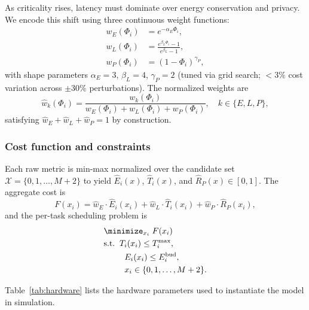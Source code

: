 \documentclass[journal]{IEEEtran}
\newcommand{\set}[1]{\mathcal{#1}}
\begin{document}
As criticality rises, latency must dominate over energy conservation
and privacy. We encode this shift using three continuous weight
functions:
\begin{align}
  w_E(\Phi_i) &= e^{-\alpha_E \Phi_i},
  \label{eq:weight_energy}\\[4pt]
  w_L(\Phi_i) &= \frac{e^{\beta_L \Phi_i} - 1}{e^{\beta_L} - 1},
  \label{eq:weight_latency}\\[4pt]
  w_P(\Phi_i) &= (1 - \Phi_i)^{\gamma_P},
  \label{eq:weight_privacy}
\end{align}
with shape parameters $\alpha_E = 3$, $\beta_L = 4$, $\gamma_P = 2$
(tuned via grid search; $<3\%$ cost variation across $\pm 30\%$
perturbations). The normalized weights are
\begin{equation}
  \hat{w}_k(\Phi_i) = \frac{w_k(\Phi_i)}{w_E(\Phi_i)+w_L(\Phi_i)+w_P(\Phi_i)},
  \quad k \in \{E,L,P\},
  \label{eq:weight_normalised}
\end{equation}
satisfying $\hat{w}_E + \hat{w}_L + \hat{w}_P = 1$ by construction.

\subsubsection{Cost function and constraints}

Each raw metric is min-max normalized over the candidate set
$\set{X}=\{0,1,\ldots,M+2\}$ to yield $\hat{E}_i(x)$, $\hat{T}_i(x)$,
and $\hat{R}_P(x) \in [0,1]$. The aggregate cost is
\begin{equation}
  F(x_i) =
    \hat{w}_E \cdot \hat{E}_i(x_i)
    + \hat{w}_L \cdot \hat{T}_i(x_i)
    + \hat{w}_P \cdot \hat{R}_P(x_i),
  \label{eq:cost_function}
\end{equation}
and the per-task scheduling problem is
\begin{align}
  &\minimize_{x_i}\; F(x_i) \label{eq:opt_obj}\\
  &\text{s.t.}\;\;T_i(x_i) \leq T^{\max}_i, \label{eq:sla_c}\\
  &\;\;\;\;\;\;\;\;\;E_i(x_i) \leq E^{\mathrm{bud}}_i, \label{eq:energy_c}\\
  &\;\;\;\;\;\;\;\;\;x_i \in \{0,1,\ldots,M+2\}. \label{eq:domain_c}
\end{align}

Table~\ref{tab:hardware} lists the hardware parameters used to
instantiate the model in simulation.
\end{document}

